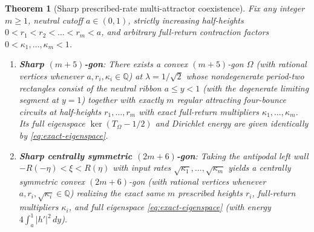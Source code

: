 \documentclass[11pt,reqno]{amsart}
\newtheorem{theorem}{Theorem}[section]
\theoremstyle{definition}
\theoremstyle{remark}
\newcommand{\Q}{\mathbb{Q}}
\begin{document}
\begin{theorem}[Sharp prescribed-rate multi-attractor coexistence]\label{thm:prescribed}
Fix any integer $m \ge 1$, neutral cutoff $a \in (0,1)$, strictly increasing half-heights $0 < r_1 < r_2 < \dots < r_m < a$, and arbitrary full-return contraction factors $0 < \kappa_1, \dots, \kappa_m < 1$.
\begin{enumerate}
  \item \textbf{Sharp $(m+5)$-gon}: There exists a convex $(m+5)$-gon $\Omega$ (with rational vertices whenever $a, r_i, \kappa_i \in \Q$) at $\lambda = 1/\sqrt{2}$ whose nondegenerate period-two rectangles consist of the neutral ribbon $a \le y < 1$ (with the degenerate limiting segment at $y = 1$) together with exactly $m$ regular attracting four-bounce circuits at half-heights $r_1, \dots, r_m$ with exact full-return multipliers $\kappa_1, \dots, \kappa_m$. Its full eigenspace $\ker(T_\Omega - 1/2)$ and Dirichlet energy are given identically by \eqref{eq:exact-eigenspace}.
  \item \textbf{Sharp centrally symmetric $(2m+6)$-gon}: Taking the antipodal left wall $-R(-\eta) < \xi < R(\eta)$ with input rates $\sqrt{\kappa_1}, \dots, \sqrt{\kappa_m}$ yields a centrally symmetric convex $(2m+6)$-gon (with rational vertices whenever $a, r_i, \sqrt{\kappa_i} \in \Q$) realizing the exact same $m$ prescribed heights $r_i$, full-return multipliers $\kappa_i$, and full eigenspace \eqref{eq:exact-eigenspace} (with energy $4\int_a^1 |h'|^2\,dy$).
\end{enumerate}
\end{theorem}
\end{document}
